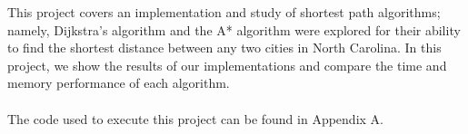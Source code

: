 \documentclass[]{../ncmathy}
\begin{document}
This project covers an implementation and study of shortest path algorithms; namely, Dijkstra's algorithm and the A* algorithm were explored for their ability to find the shortest distance between any two cities in North Carolina. In this project, we show the results of our implementations and compare the time and memory performance of each algorithm.
\\\\
The code used to execute this project can be found in Appendix A.
\end{document}
